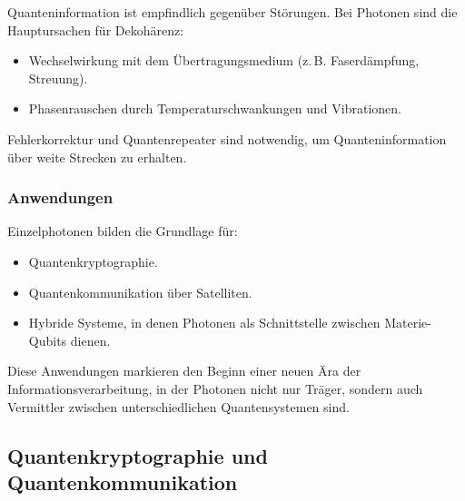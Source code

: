 Quanteninformation ist empfindlich gegenüber Störungen. Bei Photonen sind die Hauptursachen für Dekohärenz:
\begin{itemize}
	\item Wechselwirkung mit dem Übertragungsmedium (z.\,B. Faserdämpfung, Streuung).
	\item Phasenrauschen durch Temperaturschwankungen und Vibrationen.
\end{itemize}
Fehlerkorrektur und Quantenrepeater sind notwendig, um Quanteninformation über weite Strecken zu erhalten.
\newpage
\noindent
\subsubsection{Anwendungen}

Einzelphotonen bilden die Grundlage für:
\begin{itemize}
	\item Quantenkryptographie.
	\item Quantenkommunikation über Satelliten.
	\item Hybride Systeme, in denen Photonen als Schnittstelle zwischen Materie-Qubits dienen.
\end{itemize}
Diese Anwendungen markieren den Beginn einer neuen Ära der Informationsverarbeitung, in der Photonen nicht nur Träger, sondern auch Vermittler zwischen unterschiedlichen Quantensystemen sind.

\subsection{Quantenkryptographie und Quantenkommunikation} \label{sec:quantum_crypto}

